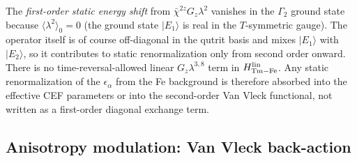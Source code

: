 \documentclass[reprint,amsmath,amssymb,aps,prb,longbibliography]{revtex4-2}
\begin{document}
The \emph{first-order static energy shift} from
$\bar\chi^{2z}G_z\lambda^2$ vanishes in the $\Gamma_2$ ground state
because $\langle\lambda^2\rangle_0 = 0$ (the ground state $|E_1\rangle$
is real in the $T$-symmetric gauge). The operator itself is of course
off-diagonal in the qutrit basis and mixes $|E_1\rangle$ with
$|E_2\rangle$, so it contributes to static renormalization only from
second order onward. There is
no time-reversal-allowed linear $G_z\lambda^{3,8}$ term in
$H_{\rm Tm-Fe}^{\rm lin}$. Any static renormalization of the
$\epsilon_\alpha$ from the Fe background is therefore absorbed into the
effective CEF parameters or into the second-order Van Vleck functional,
not written as a first-order diagonal exchange term.

\subsection{Anisotropy modulation: Van Vleck back-action}
\label{sec:vanvleck}
\end{document}
